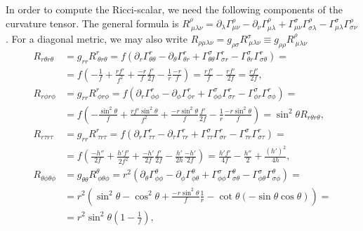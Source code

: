 \documentclass[english, parskip=full]{scrartcl}
\newcommand{\kla}{}
\begin{document}
In order to compute the Ricci-scalar, we need the following components of the curvature tensor.
The general formula is $R^\rho_{\ \mu\lambda\nu} = \partial_\lambda \Gamma^\rho_{\mu\nu} - \partial_\nu \Gamma^\rho_{\mu\lambda} + \Gamma^\sigma_{\mu\nu} \Gamma^\rho_{\sigma\lambda} - \Gamma^\sigma_{\mu\lambda} \Gamma^\rho_{\sigma\nu}$.
For a diagonal metric, we may also write $R_{\rho\mu\lambda\nu} = g_{\rho\sigma} R^\sigma_{\ \mu\lambda\nu} \equiv g_{\rho\rho} R^\rho_{\ \mu\lambda\nu}$
\begin{align}
R_{r\theta r\theta} &= g_{rr} R^r_{\ \theta r\theta} = f \kla\left( \partial_r \Gamma^r_{\theta\theta} - \partial_\theta \Gamma^r_{\theta r} + \Gamma^\sigma_{\theta\theta}\Gamma^r_{\sigma r} - \Gamma^\sigma_{\theta r} \Gamma^r_{\sigma\theta} \right) = \\
&= f\kla\left( -\frac{1}{f} + \frac{rf'}{f^2} + \frac{-r}{f} \frac{f'}{2f} - \frac{1}{r} \frac{-r}{f} \right) = \frac{rf'}{f} - \frac{rf'}{2f} = \frac{rf'}{2f},\\
R_{r\phi r\phi} &= g_{rr} R^r_{\ \phi r\phi} = f \kla\left( \partial_r \Gamma^r_{\phi\phi} - \partial_\phi \Gamma^r_{\phi r} + \Gamma^\sigma_{\phi\phi}\Gamma^r_{\sigma r} - \Gamma^\sigma_{\phi r} \Gamma^r_{\sigma\phi} \right) = \\
&= f \kla\left( -\frac{\sin^2\theta}{f} + \frac{rf'\sin^2\theta}{f^2} + \frac{-r\sin^2\theta}{f}\frac{f'}{2f} - \frac{1}{r} \frac{-r\sin^2\theta}{f} \right) = \sin^2\theta R_{r\theta r\theta},\\
R_{r\tau r\tau} &= g_{rr} R^r_{\ \tau r\tau} = f \kla\left( \partial_r \Gamma^r_{\tau\tau} - \partial_\tau \Gamma^r_{\tau r} + \Gamma^\sigma_{\tau\tau}\Gamma^r_{\sigma r} - \Gamma^\sigma_{\tau r} \Gamma^r_{\sigma\tau} \right) = \\
&= f \kla\left( \frac{-h''}{2f} + \frac{h'f'}{2f^2} + \frac{-h'}{2f} \frac{f'}{2f} - \frac{h'}{2h} \frac{-h'}{2f} \right) = \frac{h'f'}{4f} - \frac{h''}{2} + \frac{(h')^2}{4h},\\
R_{\theta\phi \theta\phi} &= g_{\theta\theta} R^\theta_{\ \phi \theta\phi} = r^2 \kla\left( \partial_\theta \Gamma^\theta_{\phi\phi} - \partial_\phi \Gamma^\theta_{\phi \theta} + \Gamma^\sigma_{\phi\phi}\Gamma^\theta_{\sigma \theta} - \Gamma^\sigma_{\phi \theta} \Gamma^\theta_{\sigma\phi} \right) = \\
&= r^2 \kla\left( \sin^2\theta - \cos^2\theta + \frac{-r\sin^2\theta}{f} \frac{1}{r} - \cot\theta (-\sin\theta\cos\theta) \right) = \\
&= r^2\sin^2\theta \kla\left( 1 - \frac{1}{f} \right),\\

\end{align}
\end{document}
